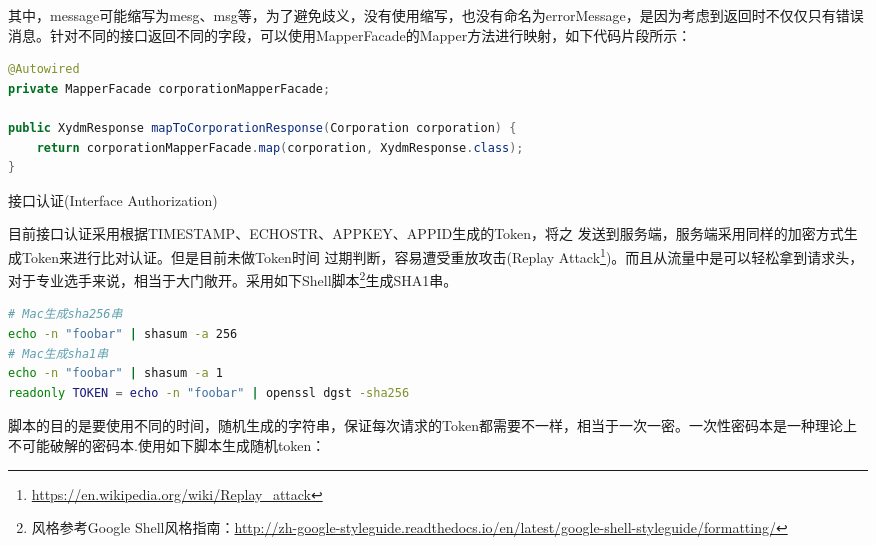 \documentclass[12pt]{book}
\makeatletter
\numberwithin{dummy}{section}
\theoremstyle{ocrenumbox}
\theoremstyle{blacknumex}
\theoremstyle{blacknumbox}
\theoremstyle{ocrenum}
\renewcommand{\subsection}{\@startsection {subsection}{2}{\z@}
	{-3ex \@plus -0.1ex \@minus -.4ex}
	{0.5ex \@plus.2ex }
	{\normalfont\sffamily\bfseries}}
\newlength\esp
\makeatother
\begin{document}
其中，message可能缩写为mesg、msg等，为了避免歧义，没有使用缩写，也没有命名为errorMessage，是因为考虑到返回时不仅仅只有错误消息。针对不同的接口返回不同的字段，可以使用MapperFacade的Mapper方法进行映射，如下代码片段所示：

\begin{lstlisting}[language=Java]
@Autowired
private MapperFacade corporationMapperFacade;

public XydmResponse mapToCorporationResponse(Corporation corporation) {
	return corporationMapperFacade.map(corporation, XydmResponse.class);
}
\end{lstlisting}

\subsection{接口认证(Interface Authorization)}
\label{sec:authorization}

目前接口认证采用根据TIMESTAMP、ECHOSTR、APPKEY、APPID生成的Token，将之
发送到服务端，服务端采用同样的加密方式生成Token来进行比对认证。但是目前未做Token时间
过期判断，容易遭受重放攻击(Replay Attack\footnote{\url{https://en.wikipedia.org/wiki/Replay_attack}})。而且从流量中是可以轻松拿到请求头，对于专业选手来说，相当于大门敞开。采用如下Shell脚本\footnote{风格参考Google Shell风格指南：\url{http://zh-google-styleguide.readthedocs.io/en/latest/google-shell-styleguide/formatting/}}生成SHA1串。

\begin{lstlisting}[language=Bash]
# Mac生成sha256串
echo -n "foobar" | shasum -a 256
# Mac生成sha1串
echo -n "foobar" | shasum -a 1
readonly TOKEN = echo -n "foobar" | openssl dgst -sha256
\end{lstlisting}

脚本的目的是要使用不同的时间，随机生成的字符串，保证每次请求的Token都需要不一样，相当于一次一密。一次性密码本是一种理论上不可能破解的密码本\cite{secrettech}.使用如下脚本生成随机token：
\end{document}
